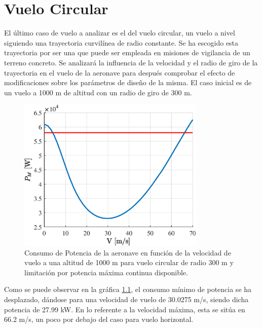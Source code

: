 \thispagestyle{empty}
\chapter{Vuelo Circular}

El último caso de vuelo a analizar es el del vuelo circular, un vuelo a nivel siguiendo una trayectoria curvilínea de radio constante. Se ha escogido esta trayectoria por ser una que puede ser empleada en misiones de vigilancia de un terreno concreto. 
Se analizará la influencia de la velocidad y el radio de giro de la trayectoria en el vuelo de la aeronave para después comprobar el efecto de modificaciones sobre los parámetros de diseño de la misma. El caso inicial es de un vuelo a 1000 m de altitud con un radio de giro de 300 m. 

\begin{figure}
	\centering
	\includegraphics[width=90mm]{graficos/PMVC}
	\caption{Consumo de Potencia de la aeronave en función de la velocidad de vuelo a una altitud de 1000 m para vuelo circular de radio 300 m y limitación por potencia máxima continua disponible.}
	\label{PMVC}
\end{figure}

Como se puede observar en la gráfica \ref{PMVC}, el consumo mínimo de potencia se ha desplazado, dándose para una velocidad de vuelo de 30.0275 m/s, siendo dicha potencia de 27.99 kW. En lo referente a la velocidad máxima, esta se sitúa en 66.2 m/s, un poco por debajo del caso para vuelo horizontal.

